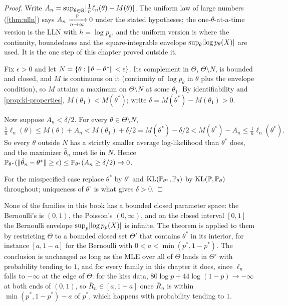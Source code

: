 \begin{proof}
Write $A_n = \sup_{\theta \in \Theta}\lvert\frac1n\ell_n(\theta) - M(\theta)\rvert$.
The uniform law of large numbers (\cref{thm:ulln}) says $A_n \xrightarrow [n \to \infty ]{\mathbb{P}} 0$ under the stated hypotheses; the one-$\theta$-at-a-time version is the LLN with $h = \log p_\theta$, and the uniform version is where the continuity, boundedness and the square-integrable envelope $\sup_\theta\lvert\log p_\theta(X)\rvert$ are used. It is the one step of this chapter proved outside it.

Fix $\epsilon > 0$ and let $N = \{\theta : \lVert\theta - \theta^*\rVert < \epsilon\}$.
Its complement in $\Theta$, $\Theta \setminus N$, is bounded and closed, and $M$ is continuous on it (continuity of $\log p_\theta$ in $\theta$ plus the envelope condition), so $M$ attains a maximum on $\Theta \setminus N$ at some $\theta_1$.
By identifiability and \cref{prop:kl-properties}, $M(\theta_1) < M(\theta^*)$; write $\delta = M(\theta^*) - M(\theta_1) > 0$.

Now suppose $A_n < \delta/2$.
For every $\theta \in \Theta \setminus N$,
\[
\tfrac1n\ell_n(\theta) \leq M(\theta) + A_n < M(\theta_1) + \delta/2 = M(\theta^*) - \delta/2 < M(\theta^*) - A_n \leq \tfrac1n\ell_n(\theta^*).
\]
So every $\theta$ outside $N$ has a strictly smaller average log-likelihood than $\theta^*$ does, and the maximizer $\hat{\theta}_n$ must lie in $N$.
Hence $\mathbb{P}_{\theta^*}(\lVert\hat{\theta}_n - \theta^*\rVert \geq \epsilon) \leq \mathbb{P}_{\theta^*}(A_n \geq \delta/2) \to 0$.

For the misspecified case replace $\theta^*$ by $\theta^\circ$ and $\mathrm{KL}(\mathbb{P}_{\theta^*}, \mathbb{P}_\theta)$ by $\mathrm{KL}(\mathbb{P}, \mathbb{P}_\theta)$ throughout; uniqueness of $\theta^\circ$ is what gives $\delta > 0$.
\end{proof}

None of the families in this book has a bounded closed parameter space: the Bernoulli's is $(0, 1)$, the Poisson's $(0, \infty)$, and on the closed interval $[0, 1]$ the Bernoulli envelope $\sup_p\lvert\log p_p(X)\rvert$ is infinite.
The theorem is applied to them by restricting $\Theta$ to a bounded closed set $\Theta'$ that contains $\theta^*$ in its interior, for instance $[a, 1 - a]$ for the Bernoulli with $0 < a < \min(p^*, 1 - p^*)$.
The conclusion is unchanged as long as the MLE over all of $\Theta$ lands in $\Theta'$ with probability tending to $1$, and for every family in this chapter it does, since $\ell_n$ falls to $-\infty$ at the edge of $\Theta$: for the kiss data, $80\log p + 44\log(1 - p) \to -\infty$ at both ends of $(0, 1)$, so $\bar{R}_n \in [a, 1 - a]$ once $\bar{R}_n$ is within $\min(p^*, 1 - p^*) - a$ of $p^*$, which happens with probability tending to $1$.

